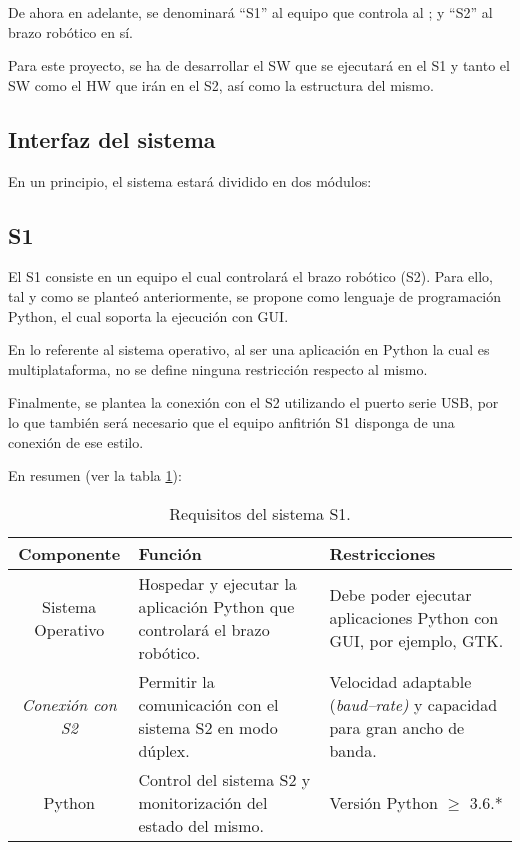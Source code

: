De ahora en adelante, se denominará ``\ac{S1}'' al equipo que controla al \pArm{}; y ``\ac{S2}'' al brazo robótico en sí.

Para este proyecto, se ha de desarrollar el \ac{SW} que se ejecutará en el \ac{S1} y tanto el \ac{SW} como el \ac{HW} que irán en el \ac{S2}, así como la estructura del mismo.

\subsection{Interfaz del sistema}
En un principio, el sistema estará dividido en dos módulos:

\subsection*{\ac{S1}}
El \ac{S1} consiste en un equipo el cual controlará el brazo robótico (\ac{S2}). Para ello, tal y como se planteó anteriormente, se propone como lenguaje de programación Python, el cual soporta la ejecución con \ac{GUI}.

En lo referente al sistema operativo, al ser una aplicación en Python la cual es multiplataforma, no se define ninguna restricción respecto al mismo.

Finalmente, se plantea la conexión con el \ac{S2} utilizando el puerto serie \ac{USB}, por lo que también será necesario que el equipo anfitrión \ac{S1} disponga de una conexión de ese estilo.

En resumen (ver la tabla \ref{tab:s1_requirements}):

\begin{table}[H]
    \centering
    \begin{tabularx}{\textwidth}{| c | X | X |}
        \hline
        \textbf{Componente} & \textbf{Función} & \textbf{Restricciones} \\
        \hline\hline
        Sistema Operativo & Hospedar y ejecutar la aplicación Python que controlará el brazo robótico. & Debe poder ejecutar aplicaciones Python con \ac{GUI}, por ejemplo, \ac{GTK}. \\
        \hline
        \textit{Conexión con \ac{S2}} & Permitir la comunicación con el sistema \ac{S2} en modo dúplex. & Velocidad adaptable (\textit{baud--rate)} y capacidad para gran ancho de banda. \\
        \hline
        Python & Control del sistema \ac{S2} y monitorización del estado del mismo. & Versión Python $\geqslant$ 3.6.* \\
        \hline
    \end{tabularx}
    \caption{Requisitos del sistema \ac{S1}.}
    \label{tab:s1_requirements}
\end{table}


